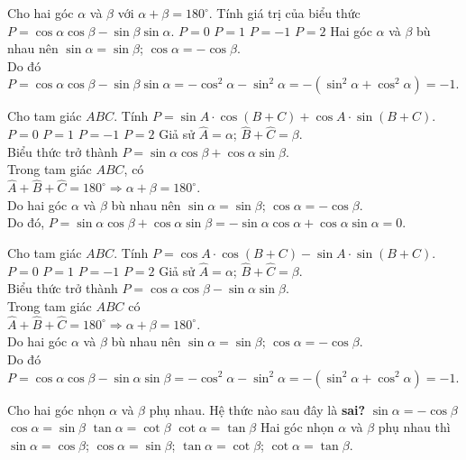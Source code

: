 \begin{ex}%
	Cho hai góc $\alpha $ và $\beta $ với $\alpha +\beta =180^\circ $. Tính giá trị của biểu thức \break $P=\cos \alpha \cos \beta -\sin \beta \sin \alpha $.
	\choice
	{$P=0$}
	{$P=1$}
	{\True $P=-1$}
	{$P=2$}
	\loigiai
	{Hai góc $\alpha $ và $\beta $ bù nhau nên $\sin \alpha =\sin \beta $; $\cos \alpha =-\cos \beta $.\\
		Do đó $P=\cos \alpha \cos \beta -\sin \beta \sin \alpha =-\cos^2\alpha -\sin ^2\alpha =-(\sin ^2\alpha +\cos^2\alpha )=-1$.}
\end{ex}
\begin{ex}%
	Cho tam giác $ABC$. Tính $P=\sin A\cdot \cos (B+C )+\cos A\cdot \sin (B+C )$.
	\choice
	{\True $P=0$}
	{$P=1$}
	{$P=-1$}
	{$P=2$}
	\loigiai
	{Giả sử $\widehat{A}=\alpha$; $\widehat{B}+\widehat{C}=\beta $.\\ Biểu thức trở thành $P=\sin \alpha \cos \beta +\cos \alpha \sin \beta $.\\
		Trong tam giác $ABC$, có\\ $\widehat{A}+\widehat{B}+\widehat{C}=180^\circ \Rightarrow \alpha +\beta =180^\circ $.\\
		Do hai góc $\alpha $ và $\beta $ bù nhau nên $\sin \alpha =\sin \beta $; $\cos \alpha =-\cos \beta $.\\
		Do đó, $P=\sin \alpha \cos \beta +\cos \alpha \sin \beta =-\sin \alpha \cos \alpha +\cos \alpha \sin \alpha =0$.}
\end{ex}
\begin{ex}%
	Cho tam giác $ABC$. Tính $P=\cos A\cdot\cos (B+C )-\sin A\cdot\sin (B+C )$.
	\choice
	{$P=0$}
	{$P=1$}
	{\True $P=-1$}
	{$P=2$}
	\loigiai
	{Giả sử $\widehat{A}=\alpha$; $\widehat{B}+\widehat{C}=\beta $.\\ Biểu thức trở thành $P=\cos \alpha \cos \beta -\sin \alpha \sin \beta $.\\
		Trong tam giác $ABC$ có\\ $\widehat{A}+\widehat{B}+\widehat{C}=180^\circ \Rightarrow \alpha +\beta =180^\circ $.\\
		Do hai góc $\alpha $ và $\beta $ bù nhau nên $\sin \alpha =\sin \beta $; $\cos \alpha =-\cos \beta $.\\
		Do đó $P=\cos \alpha \cos \beta -\sin \alpha \sin \beta =-\cos^2\alpha -\sin ^2\alpha =-(\sin ^2\alpha +\cos^2\alpha )=-1$.}
\end{ex}
\begin{ex}%
	Cho hai góc nhọn $\alpha $ và $\beta $ phụ nhau. Hệ thức nào sau đây là \textbf{sai?}
	\choice
	{\True $\sin \alpha =-\cos \beta $}
	{$\cos \alpha =\sin \beta $}
	{$\tan \alpha =\cot \beta $}
	{$\cot \alpha =\tan \beta $}
	\loigiai
	{Hai góc nhọn $\alpha $ và $\beta $ phụ nhau thì $\sin \alpha =\cos \beta$;  $\cos\alpha =\sin\beta$; $\tan\alpha =\cot\beta$; $\cot \alpha =\tan\beta $.}
\end{ex}

